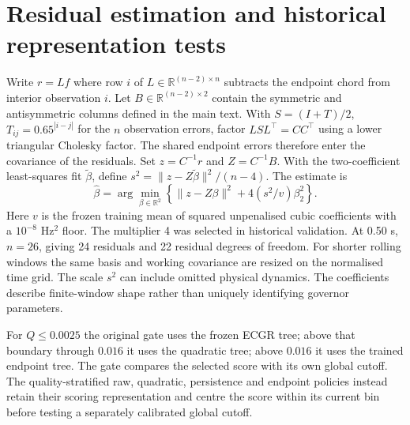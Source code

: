 \documentclass[10pt]{article}
\begin{document}
\section{Residual estimation and historical representation tests}
Write $r=Lf$ where row $i$ of $L\in\mathbb R^{(n-2)\times n}$ subtracts the endpoint chord from interior observation $i$. Let $B\in\mathbb R^{(n-2)\times2}$ contain the symmetric and antisymmetric columns defined in the main text. With $S=(I+T)/2$, $T_{ij}=0.65^{|i-j|}$ for the $n$ observation errors, factor $LSL^\top=CC^\top$ using a lower triangular Cholesky factor. The shared endpoint errors therefore enter the covariance of the residuals. Set $z=C^{-1}r$ and $Z=C^{-1}B$. With the two-coefficient least-squares fit $\tilde\beta$, define $s^2=\|z-Z\tilde\beta\|^2/(n-4)$. The estimate is
\[
 \hat\beta=\arg\min_{\beta\in\mathbb R^2}\left\{\|z-Z\beta\|^2+4(s^2/v)\beta_2^2\right\}.
\]
Here $v$ is the frozen training mean of squared unpenalised cubic coefficients with a $10^{-8}$ Hz$^2$ floor. The multiplier 4 was selected in historical validation. At 0.50 s, $n=26$, giving 24 residuals and 22 residual degrees of freedom. For shorter rolling windows the same basis and working covariance are resized on the normalised time grid. The scale $s^2$ can include omitted physical dynamics. The coefficients describe finite-window shape rather than uniquely identifying governor parameters.

For $Q\le0.0025$ the original gate uses the frozen ECGR tree; above that boundary through $0.016$ it uses the quadratic tree; above $0.016$ it uses the trained endpoint tree. The gate compares the selected score with its own global cutoff. The quality-stratified raw, quadratic, persistence and endpoint policies instead retain their scoring representation and centre the score within its current bin before testing a separately calibrated global cutoff.
\end{document}
